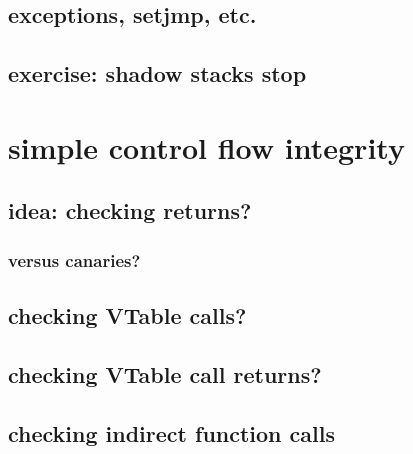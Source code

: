 \subsection{exceptions, setjmp, etc.}


\subsection{exercise: shadow stacks stop}


\section{simple control flow integrity}

\subsection{idea: checking returns?}



        

\subsubsection{versus canaries?}


\subsection{checking VTable calls?}


\subsection{checking VTable call returns?}


\subsection{checking indirect function calls}



